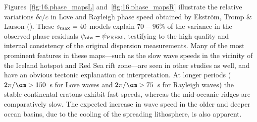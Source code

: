 Figures~\ref{fig:16.phase_mapsL} and~\ref{fig:16.phase_mapsR}
illustrate the relative variations $\delta c/c$
in Love and Rayleigh phase speed obtained by
Ekstr\"{o}m, Tromp \& Larson (\citeyear{ekstrom&al96}).
These $s_{\rm max}=40$ models explain $70\!-\!96$\%
of the variance in the observed phase residuals
$\psi_{\rm obs}-\psi_{\rm PREM}$, testifying to
the high quality and internal consistency of the
original dispersion measurements.  Many of the most
prominent features in these maps---such as the slow wave
speeds in the vicinity of the Iceland hotspot and Red Sea
rift zone---are seen in other studies as well, and have
an obvious tectonic explanation or interpretation.  At longer
periods ($2\pi/\om>150$~s for Love waves and $2\pi/\om>75$~s
for Rayleigh waves) the stable continental cratons exhibit fast
speeds, whereas the mid-oceanic ridges are comparatively slow.
The expected increase in wave speed in the older and deeper
ocean basins, due to the cooling of the spreading lithosphere,
is also apparent.
